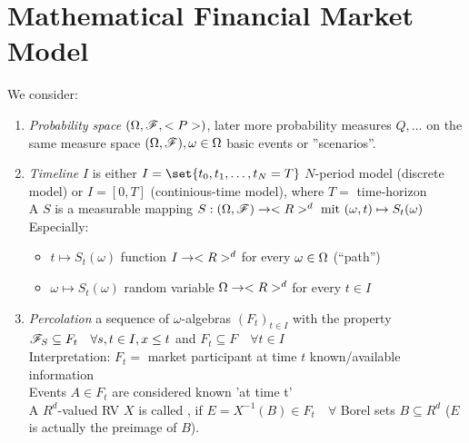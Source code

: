 \section{Mathematical Financial Market Model}
We consider:
\begin{enumerate}
	\item \emph{Probability space} $(\Omega,\mathscr F,<P>)$, later more probability measures $Q, \dots$ on the same measure space $(\Omega,\mathscr F), \omega \in \Omega$ basic events or ''scenarios''.
	\item \emph{Timeline} $I$ is either $I=\set{t_0, t_1, \dots, t_N=T}$ $N$-period model (discrete model) or $I = [0,T]$ (continious-time model), where $T = $ time-horizon\\
	A  $S$ is a measurable mapping $S: (\Omega,\mathscr F) \to <R>^d \text{ mit } (\omega, t) \mapsto S_t(\omega)$\\
	Especially:
	\begin{itemize}
		\item $t \mapsto S_t(\omega)$ function $I \to <R>^d$ for every $\omega \in \Omega$ (``path'')
		\item $\omega \mapsto S_t(\omega)$ random variable $\Omega \to <R>^d$ for every $t \in I$
	\end{itemize}
	\item \emph{Percolation} 
	a sequence of $\omega$-algebras $(F_t)_{t \in I}$ with the property $\mathscr F_S \subseteq F_t \quad \forall s,t \in I, x \le t$ and $F_t \subseteq F\quad \forall t \in I$\\
	Interpretation: $F_t=$ market participant at time $t$ known/available information\\
	Events $A \in F_t$ are considered known 'at time t'\\
	A $R^d$-valued RV $X$ is called  , if $E = X^{-1}(B) \in F_t \quad \forall$ Borel sets $B \subseteq R^d$ ($E$ is actually the preimage of $B$).
	

\end{enumerate}

